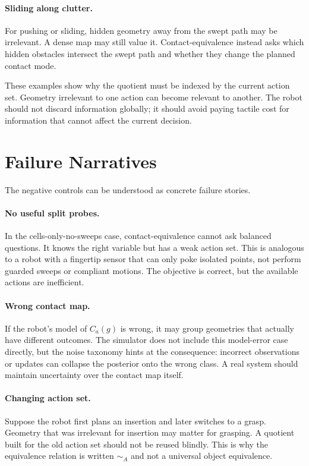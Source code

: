 \documentclass{article}
\begin{document}
\paragraph{Sliding along clutter.}
For pushing or sliding, hidden geometry away from the swept path may be irrelevant. A dense map may still value it. Contact-equivalence instead asks which hidden obstacles intersect the swept path and whether they change the planned contact mode.

These examples show why the quotient must be indexed by the current action set. Geometry irrelevant to one action can become relevant to another. The robot should not discard information globally; it should avoid paying tactile cost for information that cannot affect the current decision.

\section{Failure Narratives}

The negative controls can be understood as concrete failure stories.

\paragraph{No useful split probes.}
In the cells-only-no-sweeps case, contact-equivalence cannot ask balanced questions. It knows the right variable but has a weak action set. This is analogous to a robot with a fingertip sensor that can only poke isolated points, not perform guarded sweeps or compliant motions. The objective is correct, but the available actions are inefficient.

\paragraph{Wrong contact map.}
If the robot's model of $C_a(g)$ is wrong, it may group geometries that actually have different outcomes. The simulator does not include this model-error case directly, but the noise taxonomy hints at the consequence: incorrect observations or updates can collapse the posterior onto the wrong class. A real system should maintain uncertainty over the contact map itself.

\paragraph{Changing action set.}
Suppose the robot first plans an insertion and later switches to a grasp. Geometry that was irrelevant for insertion may matter for grasping. A quotient built for the old action set should not be reused blindly. This is why the equivalence relation is written $\sim_A$ and not a universal object equivalence.
\end{document}
